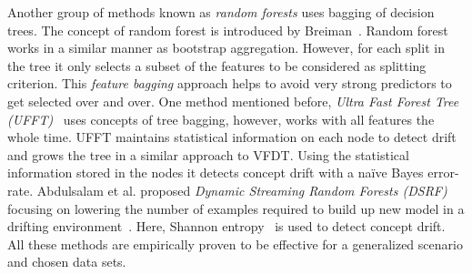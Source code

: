 
Another group of methods known as \textit{random forests} uses bagging of decision trees. The concept of random forest is introduced by Breiman~\cite{breiman99:randomforest}. Random forest works in a similar manner as bootstrap aggregation. However, for each split in the tree it only selects a subset of the features to be considered as splitting criterion. This \textit{feature bagging} approach helps to avoid very strong predictors to get selected over and over. One method mentioned before, \textit{Ultra Fast Forest Tree (UFFT)}~\cite{gama04:ft, gama05:ft} uses concepts of tree bagging, however, works with all features the whole time. UFFT maintains statistical information on each node to detect drift and grows the tree in a similar  approach to VFDT. Using the statistical information stored in the nodes it detects concept drift with a na\"ive Bayes error-rate. Abdulsalam et al. proposed \textit{Dynamic Streaming Random Forests (DSRF)} focusing on lowering the number of examples required to build up new model in a drifting environment~\cite{salam08:dsrf, salam11:dsrf}. Here, Shannon entropy~\cite{shannon01:entropy} is used to detect concept drift. All these methods are empirically proven to be effective for a generalized scenario and chosen data sets. 


\clearpage
